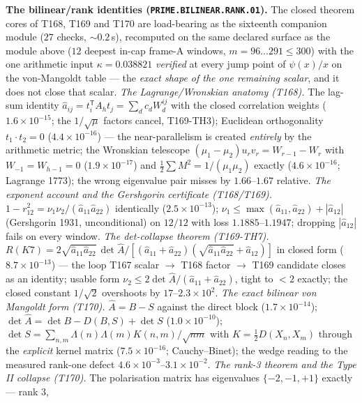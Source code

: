 \par\smallskip\noindent\textbf{The bilinear/rank identities
(\texttt{PRIME.BILINEAR.RANK.01}).}
The closed theorem cores of T168, T169 and T170 are load-bearing as the
sixteenth companion module ($27$ checks, ${\sim}0.2$\,s), recomputed on
the same declared surface as the module above ($12$ deepest in-cap
frame-A windows, $m=96\ldots291\le300$) with the one arithmetic input
$\kappa=0.038821$ \emph{verified} at every jump point of $\psi(x)/x$ on
the von-Mangoldt table --- the \emph{exact shape of the one remaining
scalar}, and it does not close that scalar.
\emph{The Lagrange/Wronskian anatomy (T168).} The lag-sum identity
$\hat a_{ij}=t_i^{\mathsf T}A_ht_j=\sum_d c_dW^{ij}_d$ with the closed
correlation weights ($1.6\times10^{-15}$; the $1/\sqrt{\mu}$ factors
cancel, T169-TH3); Euclidean orthogonality $t_1\cdot t_2=0$
($4.4\times10^{-16}$) --- the near-parallelism is created \emph{entirely}
by the arithmetic metric; the Wronskian telescope
$(\mu_1-\mu_2)u_rv_r=W_{r-1}-W_r$ with $W_{-1}=W_{h-1}=0$
($1.9\times10^{-17}$) and $\tfrac12\sum M^2=1/(\mu_1\mu_2)$ exactly
($4.6\times10^{-16}$; Lagrange 1773); the wrong eigenvalue pair misses by
$1.66$--$1.67$ relative.
\emph{The exponent account and the Gershgorin certificate (T168/T169).}
$1-r_{12}^2=\nu_1\nu_2/(\hat a_{11}\hat a_{22})$ identically
($2.5\times10^{-13}$); $\nu_1\le\max(\hat a_{11},\hat a_{22})+|\hat a_{12}|$
(Gershgorin 1931, unconditional) on $12/12$ with loss $1.1885$--$1.1947$;
dropping $|\hat a_{12}|$ fails on every window.
\emph{The det-collapse theorem (T169-TH7).}
$R(K7)=2\sqrt{\hat a_{11}\hat a_{22}}\,\det\hat A/[(\hat a_{11}+\hat a_{22})
(\sqrt{\hat a_{11}\hat a_{22}}+\hat a_{12})]$ in closed form
($8.7\times10^{-13}$) --- the loop T167 scalar $\to$ T168 factor $\to$
T169 candidate closes as an identity; usable form
$\nu_2\le2\det\hat A/(\hat a_{11}+\hat a_{22})$, tight to $<2$ exactly;
the closed constant $1/\sqrt2$ overshoots by $17$--$2.3\times10^{2}$.
\emph{The exact bilinear von Mangoldt form (T170).} $\hat A=B-S$ against
the direct block ($1.7\times10^{-14}$);
$\det\hat A=\det B-D(B,S)+\det S$ ($1.0\times10^{-10}$); $\det S=
\sum_{n,m}\Lambda(n)\Lambda(m)K(n,m)/\sqrt{nm}$ with
$K=\tfrac12D(X_n,X_m)$ through the \emph{explicit} kernel matrix
($7.5\times10^{-16}$; Cauchy--Binet); the wedge reading to the measured
rank-one defect $4.6\times10^{-3}$--$3.1\times10^{-2}$.
\emph{The rank-3 theorem and the Type II collapse (T170).} The
polarisation matrix has eigenvalues $\{-2,-1,+1\}$ exactly --- rank $3$,
